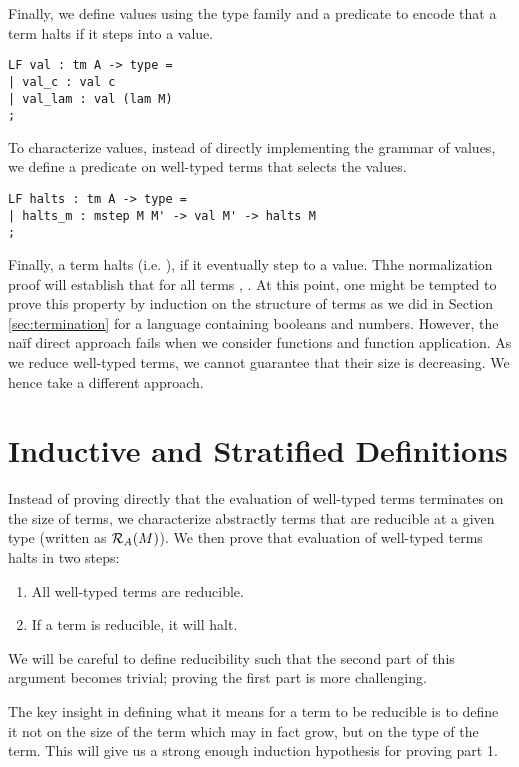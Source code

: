 Finally, we define values using the type family  and a predicate  to encode that a term halts if it steps into a value.

\begin{lstlisting}
LF val : tm A -> type =
| val_c : val c
| val_lam : val (lam M)
;
\end{lstlisting}

To characterize values, instead of directly implementing the grammar
of values, we define a predicate on well-typed terms that selects the
values.

\begin{lstlisting}
LF halts : tm A -> type =
| halts_m : mstep M M' -> val M' -> halts M
;
\end{lstlisting}

Finally, a term  halts (i.e. ), if it eventually
step to a value. 
Thhe normalization proof will establish that for all terms , 
. At
this point, one might be tempted to prove this property by induction on the
structure of terms as we did in Section \ref{sec:termination} for a
language containing booleans and numbers. However, the na\"if direct approach
fails when we consider functions and function application. As we
reduce well-typed terms, we cannot guarantee that their size is
decreasing. We hence take a different approach.

\section{Inductive and Stratified Definitions}
Instead of proving directly that the evaluation of well-typed terms
terminates on the size of terms, we characterize abstractly terms that
are reducible at a given type (written as $\mathcal{R}_{A}(M)$). We then prove
that evaluation of well-typed terms halts in two steps:

\begin{enumerate}
\item All well-typed terms are reducible. 
\item If a term is reducible, it will halt.
\end{enumerate}

We will be careful to define reducibility such that the second part of
this argument becomes trivial; proving the first part is more
challenging. 

The key insight in defining what it means for a term to be reducible
is to define it not on the size of the term which may in fact grow,
but on the type of the term. This will give us a strong enough
induction hypothesis for proving part 1. 

